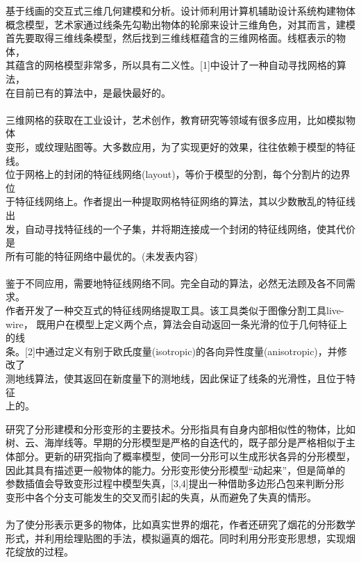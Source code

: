 \documentclass[20pt]{article} %
\begin{document}
{
基于线画的交互式三维几何建模和分析。设计师利用计算机辅助设计系统构建物体\\
概念模型，艺术家通过线条先勾勒出物体的轮廓来设计三维角色，对其而言，建模\\
首先要取得三维线条模型，然后找到三维线框蕴含的三维网格面。线框表示的物体，\\
其蕴含的网格模型非常多，所以具有二义性。[1]中设计了一种自动寻找网格的算法，\\
在目前已有的算法中，是最快最好的。\\
\\
三维网格的获取在工业设计，艺术创作，教育研究等领域有很多应用，比如模拟物体\\
变形，或纹理贴图等。大多数应用，为了实现更好的效果，往往依赖于模型的特征线。\\
位于网格上的封闭的特征线网络(layout)，等价于模型的分割，每个分割片的边界位\\
于特征线网络上。作者提出一种提取网格特征网络的算法，其以少数散乱的特征线出\\
发，自动寻找特征线的一个子集，并将期连接成一个封闭的特征线网络，使其代价是\\
所有可能的特征网络中最优的。(未发表内容)\\
\\
鉴于不同应用，需要地特征线网络不同。完全自动的算法，必然无法顾及各不同需求。\\
作者开发了一种交互式的特征线网络提取工具。该工具类似于图像分割工具live-wire，
既用户在模型上定义两个点，算法会自动返回一条光滑的位于几何特征上的线\\
条。[2]中通过定义有别于欧氏度量(isotropic)的各向异性度量(anisotropic)，并修改了\\
测地线算法，使其返回在新度量下的测地线，因此保证了线条的光滑性，且位于特征\\
上的。\\
}
\clearpage

{研究了分形建模和分形变形的主要技术。分形指具有自身内部相似性的物体，比如\\
树、云、海岸线等。早期的分形模型是严格的自迭代的，既子部分是严格相似于主\\
体部分。更新的研究指向了概率模型，使同一分形可以生成形状各异的分形模型，\\
因此其具有描述更一般物体的能力。分形变形使分形模型“动起来”，但是简单的\\
参数插值会导致变形过程中模型失真，[3,4]提出一种借助多边形凸包来判断分形\\
变形中各个分支可能发生的交叉而引起的失真，从而避免了失真的情形。\\
\\
为了使分形表示更多的物体，比如真实世界的烟花，作者还研究了烟花的分形数学\\
形式，并利用绘理贴图的手法，模拟逼真的烟花。同时利用分形变形思想，实现烟\\
花绽放的过程。
}
\end{document}
